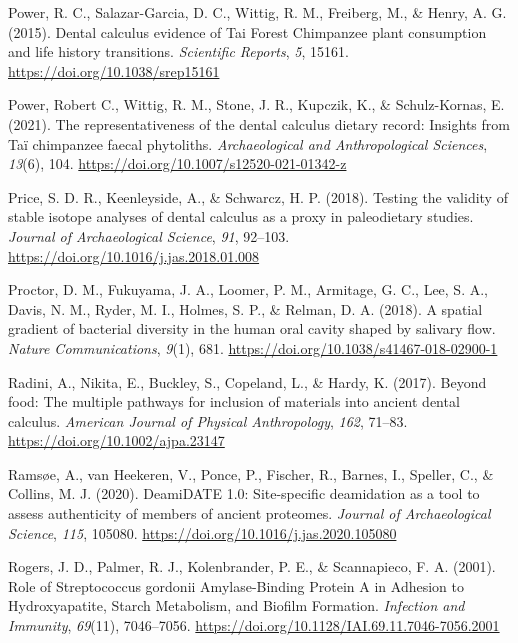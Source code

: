 \documentclass[
  b5paper,
]{book}
\newlength{\cslhangindent}
\newlength{\cslentryspacingunit} %
\newenvironment{CSLReferences}[2] %
 {%
  \setlength{\parindent}{0pt}
  \ifodd #1
  \let\oldpar\par
  \def\par{\hangindent=\cslhangindent\oldpar}
  \fi
  \setlength{\parskip}{#2\cslentryspacingunit}
 }%
 {}
\begin{document}
\begin{CSLReferences}{1}{0}
\leavevmode{}%
Power, R. C., Salazar-Garcia, D. C., Wittig, R. M., Freiberg, M., \&
Henry, A. G. (2015). Dental calculus evidence of {Tai Forest Chimpanzee}
plant consumption and life history transitions. \emph{Scientific
Reports}, \emph{5}, 15161. \url{https://doi.org/10.1038/srep15161}

\leavevmode{}%
Power, Robert C., Wittig, R. M., Stone, J. R., Kupczik, K., \&
Schulz-Kornas, E. (2021). The representativeness of the dental calculus
dietary record: Insights from {Ta{ï}} chimpanzee faecal phytoliths.
\emph{Archaeological and Anthropological Sciences}, \emph{13}(6), 104.
\url{https://doi.org/10.1007/s12520-021-01342-z}

\leavevmode{}%
Price, S. D. R., Keenleyside, A., \& Schwarcz, H. P. (2018). Testing the
validity of stable isotope analyses of dental calculus as a proxy in
paleodietary studies. \emph{Journal of Archaeological Science},
\emph{91}, 92--103. \url{https://doi.org/10.1016/j.jas.2018.01.008}

\leavevmode{}%
Proctor, D. M., Fukuyama, J. A., Loomer, P. M., Armitage, G. C., Lee, S.
A., Davis, N. M., Ryder, M. I., Holmes, S. P., \& Relman, D. A. (2018).
A spatial gradient of bacterial diversity in the human oral cavity
shaped by salivary flow. \emph{Nature Communications}, \emph{9}(1), 681.
\url{https://doi.org/10.1038/s41467-018-02900-1}

\leavevmode{}%
Radini, A., Nikita, E., Buckley, S., Copeland, L., \& Hardy, K. (2017).
Beyond food: {The} multiple pathways for inclusion of materials into
ancient dental calculus. \emph{American Journal of Physical
Anthropology}, \emph{162}, 71--83.
\url{https://doi.org/10.1002/ajpa.23147}

\leavevmode{}%
Ramsøe, A., van Heekeren, V., Ponce, P., Fischer, R., Barnes, I.,
Speller, C., \& Collins, M. J. (2020). {DeamiDATE} 1.0: {Site-specific}
deamidation as a tool to assess authenticity of members of ancient
proteomes. \emph{Journal of Archaeological Science}, \emph{115}, 105080.
\url{https://doi.org/10.1016/j.jas.2020.105080}

\leavevmode{}%
Rogers, J. D., Palmer, R. J., Kolenbrander, P. E., \& Scannapieco, F. A.
(2001). Role of {Streptococcus} gordonii {Amylase-Binding Protein A} in
{Adhesion} to {Hydroxyapatite}, {Starch Metabolism}, and {Biofilm
Formation}. \emph{Infection and Immunity}, \emph{69}(11), 7046--7056.
\url{https://doi.org/10.1128/IAI.69.11.7046-7056.2001}


\end{CSLReferences}
\end{document}
